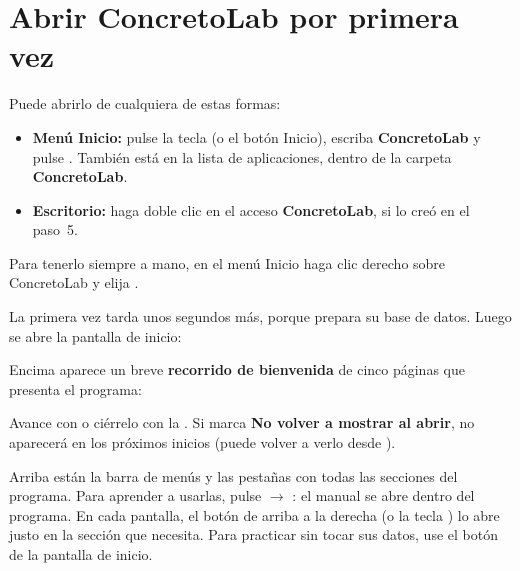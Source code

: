 \section{Abrir ConcretoLab por primera vez}


Puede abrirlo de cualquiera de estas formas:

\begin{itemize}
	\item \textbf{Menú Inicio:} pulse la tecla  (o el botón Inicio), escriba \textbf{ConcretoLab} y pulse
	      . También está en la lista de aplicaciones, dentro de la carpeta \textbf{ConcretoLab}.
	\item \textbf{Escritorio:} haga doble clic en el acceso \textbf{ConcretoLab}, si lo creó en el paso~5.
\end{itemize}

\begin{consejo}
Para tenerlo siempre a mano, en el menú Inicio haga clic derecho sobre ConcretoLab y elija .
\end{consejo}


La primera vez tarda unos segundos más, porque prepara su base de datos. Luego se abre la pantalla de inicio:


Encima aparece un breve \textbf{recorrido de bienvenida} de cinco páginas que presenta el programa:


Avance con  o ciérrelo con la . Si marca \textbf{No volver a mostrar al abrir}, no aparecerá
en los próximos inicios (puede volver a verlo desde ).

Arriba están la barra de menús y las pestañas con todas las secciones del programa. Para aprender a usarlas, pulse 
$\rightarrow$ : el manual se abre dentro del programa. En cada pantalla, el botón  de
arriba a la derecha (o la tecla ) lo abre justo en la sección que necesita. Para practicar sin tocar sus
datos, use el botón  de la pantalla de inicio.

